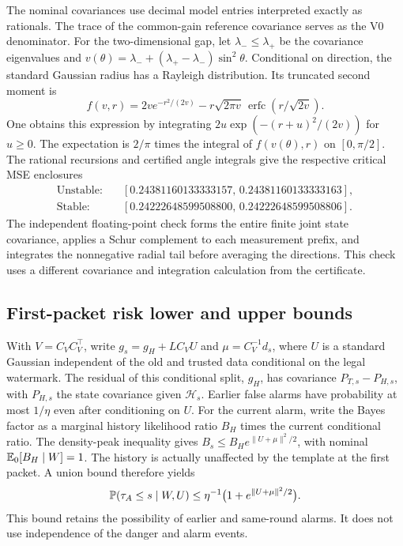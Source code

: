 The nominal covariances use decimal model entries interpreted exactly as rationals. The trace of the common-gain reference covariance serves as the V0 denominator. For the two-dimensional gap, let \(\lambda_-\le\lambda_+\) be the covariance eigenvalues and \(v(\theta)=\lambda_-+(\lambda_+-\lambda_-)\sin^2\theta\). Conditional on direction, the standard Gaussian radius has a Rayleigh distribution. Its truncated second moment is
\[
 f(v,r)=2v e^{-r^2/(2v)}-r\sqrt{2\pi v}\,
             \operatorname{erfc}\!\left(r/\sqrt{2v}\right).
\]
One obtains this expression by integrating \(2u\exp(- (r+u)^2/(2v))\) for \(u\ge0\). The expectation is \(2/\pi\) times the integral of \(f(v(\theta),r)\) on \([0,\pi/2]\). The rational recursions and certified angle integrals give the respective critical MSE enclosures
\begin{align*}
 \text{Unstable:}\quad &[0.24381160133333157,\,0.24381160133333163],\\
 \text{Stable:}\quad &[0.24222648599508800,\,0.24222648599508806].
\end{align*}
The independent floating-point check forms the entire finite joint state covariance, applies a Schur complement to each measurement prefix, and integrates the nonnegative radial tail before averaging the directions. This check uses a different covariance and integration calculation from the certificate.

\subsection{First-packet risk lower and upper bounds}

With \(V=C_V C_V^\top\), write \(g_s=g_H+LC_V U\) and \(\mu=C_V^{-1}d_s\), where \(U\) is a standard Gaussian independent of the old and trusted data conditional on the legal watermark. The residual of this conditional split, \(g_H\), has covariance \(P_{T,s}-P_{H,s}\), with \(P_{H,s}\) the state covariance given \(\mathcal H_s\). Earlier false alarms have probability at most \(1/\eta\) even after conditioning on \(U\). For the current alarm, write the Bayes factor as a marginal history likelihood ratio \(B_H\) times the current conditional ratio. The density-peak inequality gives \(B_s\le B_H e^{\|U+\mu\|^2/2}\), with nominal \(\mathbb{E}_0[B_H\mid W]=1\). The history is actually unaffected by the template at the first packet. A union bound therefore yields
\[
 \mathbb{P}(\tau_A\le s\mid W,U)\le \eta^{-1}\big(1+e^{\|U+\mu\|^2/2}\big).
\]
This bound retains the possibility of earlier and same-round alarms. It does not use independence of the danger and alarm events.

